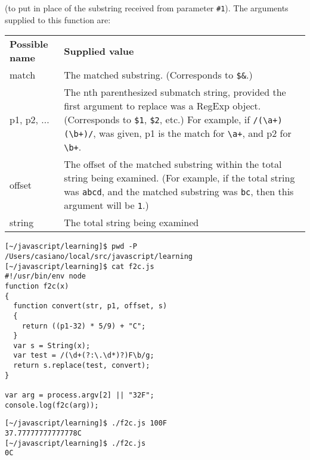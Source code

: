 \begin{enumerate}
 (to put in place of the substring received from parameter
\verb|#1|). The arguments supplied to this function are:

\begin{tabular}{|p{5cm}|p{17cm}|}
{\bf Possible name}   & {\bf Supplied value} \\
match           & The matched substring. (Corresponds to \verb|$&|.)\\
p1, p2, ...     & The nth parenthesized submatch string, provided the first argument to replace was a RegExp object. (Corresponds to \verb|$1|, \verb|$2|, etc.) 
For example, if \verb|/(\a+)(\b+)/|, was given, p1 is the match for
\verb|\a+|, and p2 for \verb|\b+|.\\
offset          & The offset of the matched substring within the total string being examined. 
                  (For example, if the total string was \verb"abcd", and the
                  matched substring was \verb"bc", then this argument will
                  be \verb|1|.) \\
string  &The total string being examined \\
\end{tabular}

\begin{verbatim}
[~/javascript/learning]$ pwd -P
/Users/casiano/local/src/javascript/learning
[~/javascript/learning]$ cat f2c.js 
#!/usr/bin/env node
function f2c(x)
{
  function convert(str, p1, offset, s)
  {
    return ((p1-32) * 5/9) + "C";
  }
  var s = String(x);
  var test = /(\d+(?:\.\d*)?)F\b/g;
  return s.replace(test, convert);
}

var arg = process.argv[2] || "32F";
console.log(f2c(arg));
\end{verbatim}

\begin{verbatim}
[~/javascript/learning]$ ./f2c.js 100F
37.77777777777778C
[~/javascript/learning]$ ./f2c.js 
0C
\end{verbatim}
\end{enumerate}


